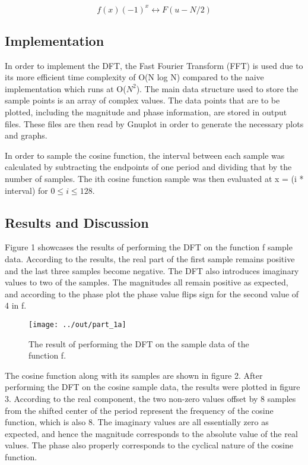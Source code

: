 \documentclass[headings=optiontoheadandtoc,listof=totoc,parskip=full]{scrartcl}
\begin{document}
        \[
        	f(x)(-1)^x \leftrightarrow F(u-N/2)
        \]


\subsection{Implementation}

In order to implement the DFT, the Fast Fourier Transform (FFT) is used due to its more efficient time complexity of O(N log N) compared to the naive implementation which runs at O(\(N^2\)). The main data structure used to store the sample points is an array of complex values. The data points that are to be plotted, including the magnitude and phase information, are stored in output files. These files are then read by Gnuplot in order to generate the necessary plots and graphs.

In order to sample the cosine function, the interval between each sample was calculated by subtracting the endpoints of one period and dividing that by the number of samples. The ith cosine function sample was then evaluated at x = (i * interval) for $0 \leq i \leq 128$.

\subsection{Results and Discussion}

Figure 1 showcases the results of performing the DFT on the function f sample data. According to the results, the real part of the first sample remains positive and the last three samples become negative. The DFT also introduces imaginary values to two of the samples. The magnitudes all remain positive as expected, and according to the phase plot the phase value flips sign for the second value of 4 in f.

\begin{figure}[ht]
	\centering
	\texttt{[image: ../out/part\_1a]}
	\caption{The result of performing the DFT on the sample data of the function f.}
	\label{fig:part_1a}
\end{figure}

The cosine function along with its samples are shown in figure 2. After performing the DFT on the cosine sample data, the results were plotted in figure 3. According to the real component, the two non-zero values offset by 8 samples from the shifted center of the period represent the frequency of the cosine function, which is also 8. The imaginary values are all essentially zero as expected, and hence the magnitude corresponds to the absolute value of the real values. The phase also properly corresponds to the cyclical nature of the cosine function.
\end{document}
